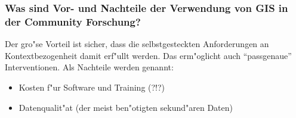 \subsubsection{Was sind Vor- und Nachteile der Verwendung von GIS in der Community Forschung?}
Der gro"se Vorteil ist sicher, dass die selbstgesteckten Anforderungen an Kontextbezogenheit damit erf"ullt werden. Das erm"oglicht auch ``passgenaue'' Interventionen. Als Nachteile werden genannt:
\begin{itemize}
        \item Kosten f"ur Software und Training (?!?)
        \item Datenqualit"at (der meist ben"otigten sekund"aren Daten)
\end{itemize}
